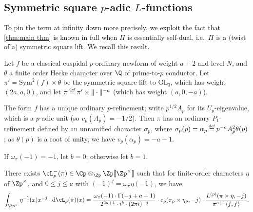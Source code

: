 \documentclass[10pt,reqno,a4paper]{amsart}
\newcommand{\GL}{\mathrm{GL}}
\begin{document}
\subsection{Symmetric square \texorpdfstring{$p$-adic $L$-functions}{p-adic L-functions}}
\label{sec:symmetric square}
To pin the term at infinity down more precisely, we exploit the fact that \cref{thm:main thm} is known in full when $\Pi$ is essentially self-dual, i.e.\ $\Pi$ is a (twist of a) symmetric square lift. We recall this result.

Let $f$ be a classical cuspidal $p$-ordinary newform of weight $a+2$ and level $N$, and $\theta$ a finite order Hecke character over $\Q$ of prime-to-$p$ conductor. Let $\pi' = \mathrm{Sym}^2(f) \times \theta$ be the symmetric square lift to $\GL_3$, which has weight $(2a,a,0)$, and let $\pi \defeq \pi' \times \|\cdot\|^{-a}$ (which has weight $(a,0,-a)$). 


The form $f$ has a unique ordinary $p$-refinement; write $p^{1/2}A_p$ for its $U_p$-eigenvalue, which is a $p$-adic unit (so $v_p(A_p) = -1/2$). Then $\pi$ has an ordinary $P_1$-refinement defined by an unramified character $\sigma_p$, where $\sigma_p(p) = \alpha_p \defeq p^{-a}A_p^2\theta(p)$; as $\theta(p)$ is a root of unity, we have $v_p(\alpha_p) = -a-1$.

If $\omega_\pi(-1) = -1$, let $b = 0$; otherwise let $b=1$.
\begin{theorem} \label{thm:sym square}
There exists $\cL_p^-(\pi) \in \Cp\otimes_{\Zp}\Zp[\![\Zp^\times]\!]$ such that for finite-order characters $\eta$ of $\Zp^\times$, and $0 \leq j \leq a$ with $(-1)^j = \omega_\pi\eta(-1)$, we have
\begin{equation}\label{eq:sym square}
	\int_{\Zp^\times} \eta^{-1}(x)x^{-j}\cdot \mathrm{d}\cL_p(\tilde\pi)(x) = \frac{\omega_\pi(-1)\cdot \Gamma(-j+a+1)}{2^{2a+4}\cdot i^b \cdot (2\pi i)^{-j}} \cdot e_p(\pi_p \times \eta_p,-j)\cdot \frac{L^{(p)}(\pi\times\eta,-j)}{\pi^{a+1}\langle f,f\rangle}.
\end{equation}
\end{theorem}
\end{document}

